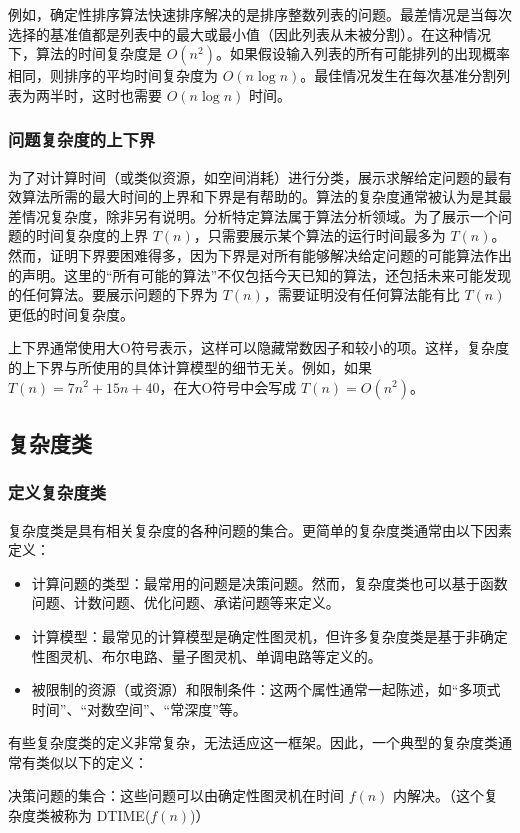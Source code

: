 例如，确定性排序算法快速排序解决的是排序整数列表的问题。最差情况是当每次选择的基准值都是列表中的最大或最小值（因此列表从未被分割）。在这种情况下，算法的时间复杂度是 \( O(n^2) \)。如果假设输入列表的所有可能排列的出现概率相同，则排序的平均时间复杂度为 \( O(n\log n) \)。最佳情况发生在每次基准分割列表为两半时，这时也需要 \( O(n\log n) \) 时间。
\subsubsection{问题复杂度的上下界}
为了对计算时间（或类似资源，如空间消耗）进行分类，展示求解给定问题的最有效算法所需的最大时间的上界和下界是有帮助的。算法的复杂度通常被认为是其最差情况复杂度，除非另有说明。分析特定算法属于算法分析领域。为了展示一个问题的时间复杂度的上界 \( T(n) \)，只需要展示某个算法的运行时间最多为 \( T(n) \)。然而，证明下界要困难得多，因为下界是对所有能够解决给定问题的可能算法作出的声明。这里的“所有可能的算法”不仅包括今天已知的算法，还包括未来可能发现的任何算法。要展示问题的下界为 \( T(n) \)，需要证明没有任何算法能有比 \( T(n) \) 更低的时间复杂度。

上下界通常使用大O符号表示，这样可以隐藏常数因子和较小的项。这样，复杂度的上下界与所使用的具体计算模型的细节无关。例如，如果 \( T(n) = 7n^2 + 15n + 40 \)，在大O符号中会写成 \( T(n) = O(n^2) \)。
\subsection{复杂度类}
\subsubsection{定义复杂度类}

复杂度类是具有相关复杂度的各种问题的集合。更简单的复杂度类通常由以下因素定义：
\begin{itemize}
\item 计算问题的类型：最常用的问题是决策问题。然而，复杂度类也可以基于函数问题、计数问题、优化问题、承诺问题等来定义。  
\item 计算模型：最常见的计算模型是确定性图灵机，但许多复杂度类是基于非确定性图灵机、布尔电路、量子图灵机、单调电路等定义的。
\item 被限制的资源（或资源）和限制条件：这两个属性通常一起陈述，如“多项式时间”、“对数空间”、“常深度”等。
\end{itemize}
有些复杂度类的定义非常复杂，无法适应这一框架。因此，一个典型的复杂度类通常有类似以下的定义：

决策问题的集合：这些问题可以由确定性图灵机在时间 \( f(n) \) 内解决。（这个复杂度类被称为 DTIME(\( f(n) \))）

